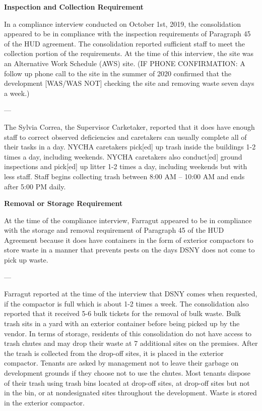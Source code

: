 
\textbf{Inspection and Collection Requirement}

In a compliance interview conducted on October 1st, 2019, the consolidation appeared to be in compliance with the inspection requirements of Paragraph 45 of the HUD agreement. The consolidation reported sufficient staff to meet the collection portion of the requirements. At the time of this interview, the site was an Alternative Work Schedule (AWS) site. (IF PHONE CONFIRMATION: A follow up phone call to the site in the summer of 2020 confirmed that the development [WAS/WAS NOT] checking the site and removing waste seven days a week.)

---

The Sylvia Correa, the Supervisor Carketaker, reported that it does have enough staff to correct observed deficiencies and caretakers can usually complete all of their tasks in a day. NYCHA caretakers pick[ed] up trash inside the buildings 1-2 times a day, including weekends. NYCHA caretakers also conduct[ed] ground inspections and pick[ed] up litter 1-2 times a day, including weekends but with less staff. Staff begins collecting trash between 8:00 AM -- 10:00 AM and ends after 5:00 PM daily. 

\textbf{Removal or Storage Requirement}

At the time of the compliance interview, Farragut appeared to be in compliance with the storage and removal requirement of Paragraph 45 of the HUD Agreement because it does have containers in the form of exterior compactors to store waste in a manner that prevents pests on the days DSNY does not come to pick up waste.

---

Farragut reported at the time of the interview that DSNY comes when requested, if the compactor is full which is about 1-2 times a week. The consolidation also reported that it received 5-6 bulk tickets for the removal of bulk waste. Bulk trash sits in a yard with an exterior container before being picked up by the vendor. In terms of storage, residents of this consolidation do not have access to trash chutes and may drop their waste at 7 additional sites on the premises. After the trash is collected from the drop-off sites, it is placed in the exterior compactor. Tenants are asked by management not to leave their garbage on development grounds if they choose not to use the chutes. Most tenants dispose of their trash using trash bins located at drop-off sites, at drop-off sites but not in the bin, or at nondesignated sites throughout the development. Waste is stored in the exterior compactor. 

